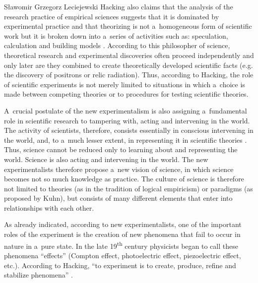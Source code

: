 \begin{artengenv}{Sławomir Grzegorz Leciejewski}
Hacking also claims that the analysis of the research practice of empirical sciences suggests that it is dominated by experimental practice and that theorizing is not a~homogeneous form of scientific work but it is broken down into a~series of activities such as: speculation, calculation and building models 
\parencite[][pp.210–217]{hacking_representing_1983}. %
 According to this philosopher of science, theoretical research and experimental discoveries often proceed independently and only later are they combined to create theoretically developed scientific facts (e.g. the discovery of positrons or relic radiation). Thus, according to Hacking, the role of scientific experiments is not merely limited to situations in which a~choice is made between competing theories or to procedures for testing scientific theories.



A~crucial postulate of the new experimentalism is also assigning a~fundamental role in scientific research to tampering with, acting and intervening in the world. The activity of scientists, therefore, consists essentially in conscious intervening in the world, and, to a~much lesser extent, in representing it in scientific theories 
\parencite[][pp.153–154]{hacking_representing_1983}. %
 Thus, science cannot be reduced only to learning about and representing the world. Science is also acting and intervening in the world. The new experimentalists therefore propose a~new vision of science, in which science becomes not so much knowledge as practice. The culture of science is therefore not limited to theories (as in the tradition of logical empiricism) or paradigms (as proposed by Kuhn), but consists of many different elements that enter into relationships with each other.

\enlargethispage{1.5\baselineskip}

As already indicated, according to new experimentalists, one of the important roles of the experiment is the creation of new phenomena that fail to occur in nature in a~pure state. In the late 19\textsuperscript{th} century physicists began to call these phenomena ``effects'' (Compton effect, photoelectric effect, piezoelectric effect, etc.). According to Hacking, ``to experiment is to create, produce, refine and stabilize phenomena'' 
\parencite[][p.230]{hacking_representing_1983}.%





\end{artengenv}
